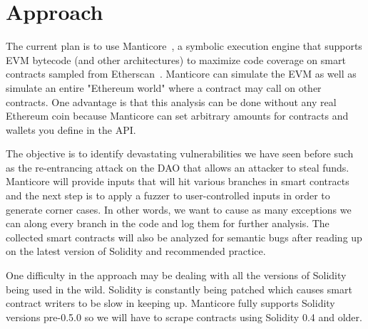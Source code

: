 \section{Approach}

The current plan is to use Manticore~\cite{manticore}, a symbolic execution engine that supports EVM bytecode (and other architectures) to maximize code coverage on smart contracts sampled from Etherscan~\cite{etherscan}.
Manticore can simulate the EVM as well as simulate an entire "Ethereum world" where a contract may call on other contracts.
One advantage is that this analysis can be done without any real Ethereum coin because Manticore can set arbitrary amounts for contracts and wallets you define in the API.

The objective is to identify devastating vulnerabilities we have seen before such as the re-entrancing attack on the DAO that allows an attacker to steal funds.
Manticore will provide inputs that will hit various branches in smart contracts and the next step is to apply a fuzzer to user-controlled inputs in order to generate corner cases.
In other words, we want to cause as many exceptions we can along every branch in the code and log them for further analysis.
The collected smart contracts will also be analyzed for semantic bugs after reading up on the latest version of Solidity and recommended practice.

One difficulty in the approach may be dealing with all the versions of Solidity being used in the wild.
Solidity is constantly being patched which causes smart contract writers to be slow in keeping up.
Manticore fully supports Solidity versions pre-0.5.0 so we will have to scrape contracts using Solidity 0.4 and older.


